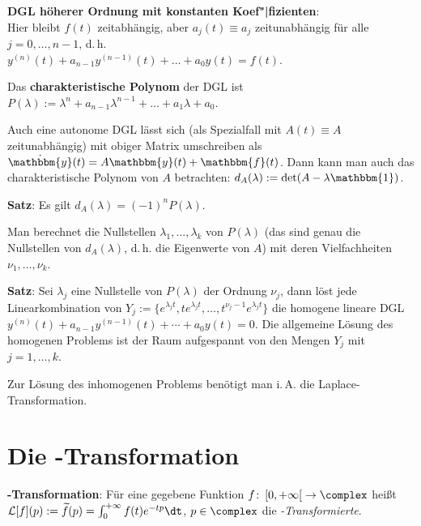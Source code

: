 \linie

\textbf{DGL höherer Ordnung mit konstanten Koef"|fizienten}: \\
Hier bleibt $f(t)$ zeitabhängig, aber $a_j(t) \equiv a_j$ zeitunabhängig
für alle $j = 0, \dotsc, n - 1$, d.\,h. \\
$y^{(n)}(t) + a_{n-1} y^{(n-1)}(t) + \dotsc + a_0 y(t) = f(t)$.

Das \textbf{charakteristische Polynom} der DGL ist
$P(\lambda) := \lambda^n + a_{n-1} \lambda^{n-1} + \dotsc + a_1 \lambda + a_0$.

Auch eine autonome DGL lässt sich (als Spezialfall mit $A(t) \equiv A$
zeitunabhängig) mit obiger Matrix umschreiben als
$\dot{\mathbbm{y}}(t) = A \mathbbm{y}(t) + \mathbbm{f}(t)$.
Dann kann man auch das charakteristische Polynom von $A$ betrachten:
$d_A(\lambda) := \det(A - \lambda \mathbbm{1})$.

\textbf{Satz}:
Es gilt $d_A(\lambda) = (-1)^n P(\lambda)$.

Man berechnet die Nullstellen $\lambda_1, \dotsc, \lambda_k$
von $P(\lambda)$ (das sind genau die Nullstellen
von $d_A(\lambda)$, d.\,h. die Eigenwerte von $A$)
mit deren Vielfachheiten $\nu_1, \dotsc, \nu_k$.

\textbf{Satz}:
Sei $\lambda_j$ eine Nullstelle von $P(\lambda)$ der Ordnung $\nu_j$,
dann löst jede Linearkombination von
$Y_j := \{e^{\lambda_j t}, t e^{\lambda_j t}, \dotsc,
t^{\nu_j - 1} e^{\lambda_j t}\}$ die homogene lineare DGL \\
$y^{(n)}(t) + a_{n-1} y^{(n-1)}(t) + \dotsb + a_0 y(t) = 0$.
Die allgemeine Lösung des homogenen Problems ist der Raum aufgespannt von
den Mengen $Y_j$ mit $j = 1, \dotsc, k$.

Zur Lösung des inhomogenen Problems benötigt man i.\,A.
die Laplace-Transformation.

\pagebreak

\section{%
    Die -Transformation%
}

\textbf{-Transformation}:
Für eine gegebene Funktion
$f\colon \left[0, +\infty\right[ \rightarrow \complex$ heißt \\
$\L[f](p) := \widetilde{f}(p) = \int_0^{+\infty} f(t) e^{-tp} \dt$,
$p \in \complex$ die \emph{-Transformierte}.

